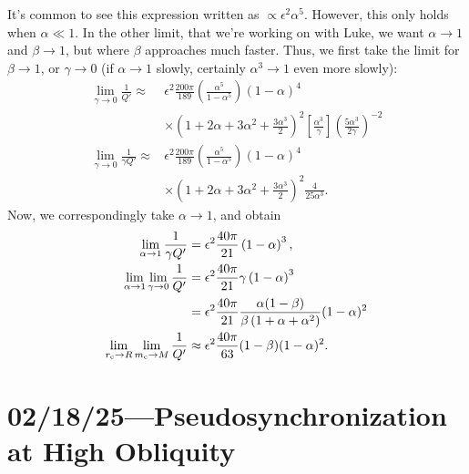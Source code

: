 \documentclass[12pt]{article}
\newcommand*{\p}[1]{\left(#1\right)}
\newcommand*{\s}[1]{\left[#1\right]}
\begin{document}
It's common to see this expression written as $\propto\epsilon^2\alpha^5$.
However, this only holds when $\alpha \ll 1$. In the other limit, that we're
working on with Luke, we want $\alpha \to 1$ and $\beta \to 1$, but where
$\beta$ approaches much faster. Thus, we first take the limit for $\beta \to 1$,
or $\gamma \to 0$ (if $\alpha \to 1$ slowly, certainly $\alpha^3 \to 1$ even
more slowly):
\begin{align}
    \lim_{\gamma \to 0}
        \frac{1}{Q'}
        \approx{}&
            \epsilon^2\frac{200\pi}{189}
            \p{\frac{\alpha^5}{1 - \alpha^5}}
            \p{1 - \alpha}^4\nonumber\\
        &\times
            \p{1 + 2\alpha + 3\alpha^2 + \frac{3\alpha^3}{2}}^2
            \s{\frac{\alpha^3}{\gamma}}
            \p{\frac{5\alpha^3}{2\gamma}}^{-2}\\
    \lim_{\gamma \to 0}
        \frac{1}{\gamma Q'}
        \approx{}&
            \epsilon^2\frac{200\pi}{189}
            \p{\frac{\alpha^5}{1 - \alpha^5}}
            \p{1 - \alpha}^4\nonumber\\
        &\times
            \p{1 + 2\alpha + 3\alpha^2 + \frac{3\alpha^3}{2}}^2
            \frac{4}{25\alpha^3}.
\end{align}
Now, we correspondingly take $\alpha \to 1$, and obtain
\begin{align}
    \lim_{\alpha \to 1}
        \frac{1}{\gamma Q'}
            &= \epsilon^2\frac{40\pi}{21} \p{1 - \alpha}^3,\\
    \lim_{\alpha \to 1}
    \lim_{\gamma \to 0}
        \frac{1}{Q'}
            &=
                \epsilon^2 \frac{40\pi}{21}
                \gamma \p{1 - \alpha}^3 \nonumber\\
            &=
                \epsilon^2 \frac{40\pi}{21}
                \frac{\alpha(1 - \beta)}{\beta\p{1 + \alpha + \alpha^2}}
                    (1 - \alpha)^2
                    \nonumber\\
    \lim_{r_{\rm c} \to R}
    \lim_{m_{\rm c} \to M}
        \frac{1}{Q'}
            &\approx
                \epsilon^2 \frac{40\pi}{63}
                (1 - \beta) (1 - \alpha)^2.
\end{align}

\section{02/18/25---Pseudosynchronization at High Obliquity}
\end{document}
